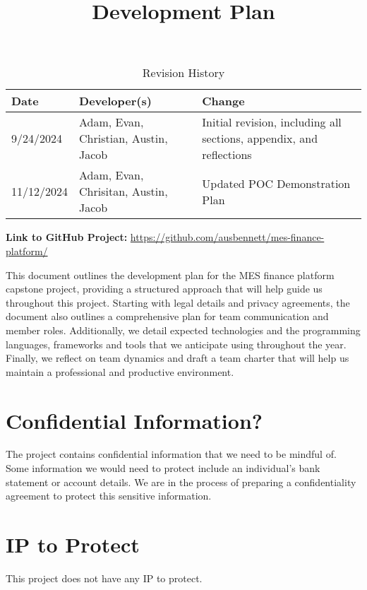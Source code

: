 \documentclass{article}
\title{Development Plan\\\progname}
\author{\authname}
\date{}
\begin{document}
\maketitle

\begin{table}[hp]
\caption{Revision History} \label{TblRevisionHistory}
\begin{tabularx}{\textwidth}{llX}
\toprule
\textbf{Date} & \textbf{Developer(s)} & \textbf{Change}\\
\midrule
9/24/2024 & Adam, Evan, Christian, Austin, Jacob & Initial revision, including all sections, appendix, and reflections\\
11/12/2024 & Adam, Evan, Chrisitan, Austin, Jacob & Updated POC Demonstration Plan\\
\bottomrule
\end{tabularx}
\end{table}

\textbf{Link to GitHub Project:} \url{https://github.com/ausbennett/mes-finance-platform/}

\newpage{}


This document outlines the development plan for the MES finance platform capstone project, providing a structured approach that will help guide us throughout this project. Starting with legal details and privacy agreements, the document also outlines a comprehensive plan for team communication and member roles. Additionally, we detail expected technologies and the programming languages, frameworks and tools that we anticipate using throughout the year. Finally, we reflect on team dynamics and draft a team charter that will help us maintain a professional and productive environment.

\section{Confidential Information?}

The project contains confidential information that we need to be mindful of. Some information we would need to protect include an individual's bank statement or account details. We are in the process of preparing a confidentiality agreement to protect this sensitive information.

\section{IP to Protect}

This project does not have any IP to protect. 
\end{document}
